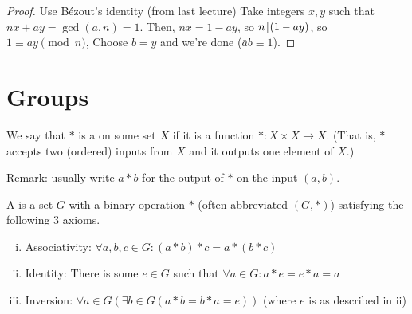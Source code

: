 \documentclass[notes.tex]{subfiles}
\begin{document}
\begin{proof}
	Use B\'ezout's identity (from last lecture)
	Take integers $x, y$ such that $nx+ay = \gcd(a, n)=1$.
	Then, $nx = 1-ay$, so $n\mkern2mu|\mkern1mu (1-ay)$, so $1\equiv ay\pmod n$, Choose $b=y$ and we're done ($\bar a \bar b \equiv \bar 1$).
\end{proof}

\chapter*{Groups}

\begin{definition}
	We say that $*$ is a  on some set $X$ if it is a function $*:X\times X \to X$. (That is, $*$ accepts two (ordered) inputs from $X$ and it outputs one element of $X$.)
\end{definition}

Remark: usually write $a*b$ for the output of $*$ on the input $(a, b)$.

\begin{definition}
	A  is a set $G$ with a binary operation $*$ (often abbreviated $(G, *)$) satisfying the following 3 axioms.
\end{definition}
\begin{enumerate}[i.]
	\item Associativity: $\forall a, b, c\in G: (a*b) *c = a*(b*c)$
	\item Identity: There is some $e\in G$ such that $\forall a\in G: a*e = e*a = a$
	\item Inversion: $\forall a\in G(\exists b\in G(a*b=b*a = e))$ (where $e$ is as described in ii)
\end{enumerate}
\end{document}
